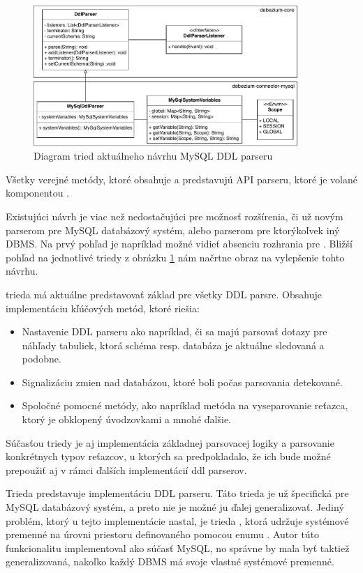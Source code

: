 \begin{figure}[H]
\begin{center}
\includegraphics[width=10cm]{figures/Old_modules.pdf}
\caption{Diagram tried aktuálneho návrhu MySQL DDL parseru}
\label{fig:class_diagram_old}
\end{center}
\end{figure}

Všetky verejné metódy, ktoré obsahuje  a  predstavujú API parseru, ktoré je volané komponentou . 

Existujúci návrh je viac než nedostačujúci pre možnosť rozšírenia, či už novým parserom pre MySQL databázový systém, alebo parserom pre ktorýkoľvek iný DBMS. Na prvý pohľad je napríklad možné vidieť absenciu rozhrania pre . Bližší pohľad na jednotlivé triedy z obrázku \ref{fig:class_diagram_old} nám načrtne obraz na vylepšenie tohto návrhu.

 trieda má aktuálne predstavovať základ pre všetky DDL parsre. Obsahuje implementáciu kľúčových metód, ktoré riešia: 
\begin{itemize}
\item Nastavenie DDL parseru ako napríklad, či sa majú parsovať dotazy pre náhľady tabuliek, ktorá schéma resp. databáza je aktuálne sledovaná a podobne.
\item Signalizáciu zmien nad databázou, ktoré boli počas parsovania detekované.
\item Spoločné pomocné metódy, ako napríklad metóda na vyseparovanie reťazca, ktorý je obklopený úvodzovkami a mnohé ďalšie.
\end{itemize}

Súčasťou  triedy je aj implementácia základnej parsovacej logiky a parsovanie konkrétnych typov reťazcov, u ktorých sa predpokladalo, že ich bude možné prepoužiť aj v rámci ďalších implementácií ddl parserov.

Trieda  predstavuje implementáciu DDL parseru. Táto trieda je už špecifická pre MySQL databázový systém, a preto nie je možné ju ďalej generalizovať. Jediný problém, ktorý u tejto implementácie nastal, je trieda , ktorá udržuje systémové premenné na úrovni priestoru definovaného pomocou enumu . Autor túto funkcionalitu implementoval ako súčasť MySQL, no správne by mala byť taktiež generalizovaná, nakoľko každý DBMS má svoje vlastné systémové premenné.

